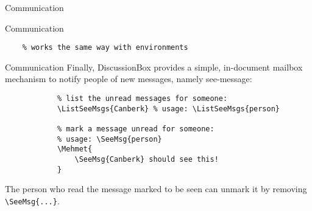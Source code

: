 \documentclass{article}
\begin{document}
\begin{discussionbox}
\begin{dboxmsg}{Communication}
\begin{dboxmsg}{Communication}
\begin{verbatim}
    % works the same way with environments
            \end{verbatim}
        \end{dboxmsg}
    \end{dboxmsg}

    \begin{dboxmsg}{Communication}
        Finally, DiscussionBox provides a simple, in-document mailbox mechanism to notify people of new messages, namely see-message:

        \begin{verbatim}
            % list the unread messages for someone:
            \ListSeeMsgs{Canberk} % usage: \ListSeeMsgs{person}

            % mark a message unread for someone:
            % usage: \SeeMsg{person}
            \Mehmet{
                \SeeMsg{Canberk} should see this!
            }
        \end{verbatim}

        The person who read the message marked to be seen can unmark it by removing \verb|\SeeMsg{...}|.
    \end{dboxmsg}
\end{discussionbox}
\end{document}
